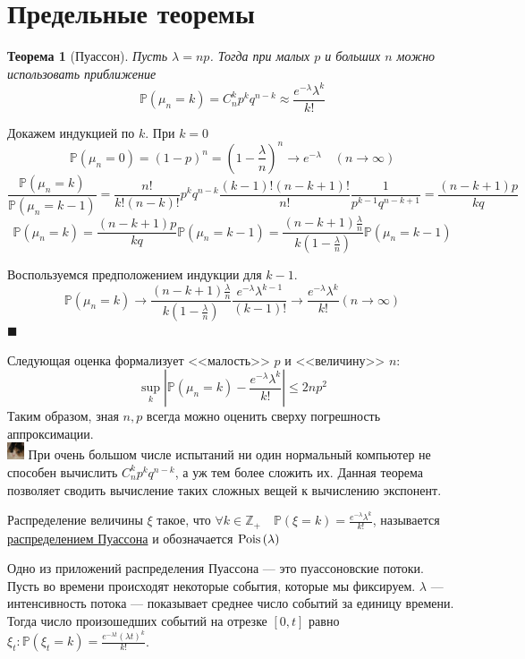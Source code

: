 \documentclass[12pt]{article}
\newtheorem{Th}{Теорема}
\newenvironment{Proof}{\par\noindent{\bf Доказательство}}{$\blacksquare$}
\newenvironment{Why}{\includegraphics[height= 5mm]{cat}}{}
\numberwithin{Th}{section}
\numberwithin{Def}{section}
\numberwithin{Lem}{section}
\numberwithin{St}{section}
\numberwithin{equation}{section}
\newcommand\Pro{\mathbb{P}} %
\newcommand\Int{\mathbb{Z}} %
\newcommand\Pois{{\rm Pois \,}}
\begin{document}
\newpage
\section{Предельные теоремы}

\begin{Th} [Пуассон]
Пусть $\lambda = np$. Тогда при малых $p$ и больших $n$ можно использовать приближение
$$\Pro(\mu_n = k) = C_n^kp^kq^{n-k} \approx \frac{e^{-\lambda}\lambda^k}{k!}$$
\end{Th}
\begin{Proof}
Докажем индукцией по $k$. При $k = 0$
$$\Pro(\mu_n = 0) = (1-p)^n = (1 - \frac{\lambda}{n})^n \longrightarrow e^{-\lambda} \quad (n \to \infty)$$
$$\frac{\Pro(\mu_n = k)}{\Pro(\mu_n = k-1)} = \frac{n!}{k!(n-k)!}p^kq^{n-k} \frac{(k-1)!(n-k+1)!}{n!} \frac{1}{p^{k-1}q^{n-k+1}} = \frac{(n-k+1)p}{kq}$$
$$\Pro(\mu_n = k) = \frac{(n-k+1)p}{kq}\Pro(\mu_n = k-1) = \frac{(n-k+1)\frac{\lambda}n}{k(1-\frac{\lambda}n)}\Pro(\mu_n = k-1)$$

Воспользуемся предположением индукции для $k-1$.
$$\Pro(\mu_n = k) \to \frac{(n-k+1)\frac{\lambda}n}{k(1-\frac{\lambda}n)} \frac{e^{-\lambda}\lambda^{k-1}}{(k-1)!} \longrightarrow \frac{e^{-\lambda}\lambda^{k}}{k!} (n \to \infty)$$
\end{Proof}

Следующая оценка формализует <<малость>> $p$ и <<величину>> $n$:
$$\sup\limits_k |\Pro(\mu_n = k) - \frac{e^{-\lambda}\lambda^k}{k!}| \le 2np^2$$
Таким образом, зная $n, p$ всегда можно оценить сверху погрешность аппроксимации.\\
\begin{Why}
При очень большом числе испытаний ни один нормальный компьютер не способен вычислить  $ C_n^kp^kq^{n-k}$, а уж тем более сложить их. Данная теорема позволяет сводить вычисление таких сложных вещей к вычислению экспонент.
\end{Why}

Распределение величины $\xi$ такое, что $\forall k \in \Int_+\quad  \Pro(\xi = k) =\frac{e^{-\lambda}\lambda^k}{k!}$, называется \underline{распределением Пуассона} 
и обозначается $\Pois(\lambda)$

Одно из приложений распределения Пуассона --- это пуассоновские потоки. Пусть во времени происходят некоторые события, которые мы фиксируем. $\lambda$ --- интенсивность потока --- показывает среднее число событий за единицу времени. Тогда число произошедших событий на отрезке $[0, t]$ равно $\xi_t\colon \Pro(\xi_t = k) = \frac{e^{-\lambda t}(\lambda t)^k}{k!}$.
\end{document}
